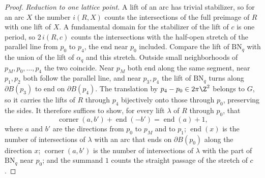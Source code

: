 \begin{proof}
\emph{Reduction to one lattice point.}  A lift of an arc has trivial stabilizer, so for an arc $X$
the number $i(R,X)$ counts the intersections of the full preimage of $R$ with one lift of $X$.  A
fundamental domain for the stabilizer of the lift of $c$ is one period, so $2\,i(R,c)$ counts the
intersections with the half-open stretch of the parallel line from $p_0$ to $p_4$, the end near $p_0$
included.  Compare the lift of $\mathrm{BN}_q$ with the union of the lift of $\alpha_q$ and this
stretch.  Outside small neighborhoods of $p_M,p_0,\dots,p_4$ the two coincide.  Near $p_M$ both end
along the same segment, near $p_1,p_2$ both follow the parallel line, and near $p_3,p_4$ the lift of
$\mathrm{BN}_q$ turns along $\partial B(p_3)$ to end on $\partial B(p_4)$.  The translation by
$p_4-p_0\in2\pi\Z^2$ belongs to $G$, so it carries the lifts of $R$ through $p_4$ bijectively onto
those through $p_0$, preserving the sides.  It therefore suffices to show, for every lift $\lambda$ of
$R$ through $p_0$, that
\begin{equation}\label{eq:local-identity}
 \operatorname{corner}(a,b')+\operatorname{end}(-b')=\operatorname{end}(a)+1,
\end{equation}
where $a$ and $b'$ are the directions from $p_0$ to $p_M$ and to $p_1$; $\operatorname{end}(x)$ is the
number of intersections of $\lambda$ with an arc that ends on $\partial B(p_0)$ along the direction
$x$; $\operatorname{corner}(a,b')$ is the number of intersections of $\lambda$ with the part of
$\mathrm{BN}_q$ near $p_0$; and the summand $1$ counts the straight passage of the stretch of $c$.


\end{proof}
